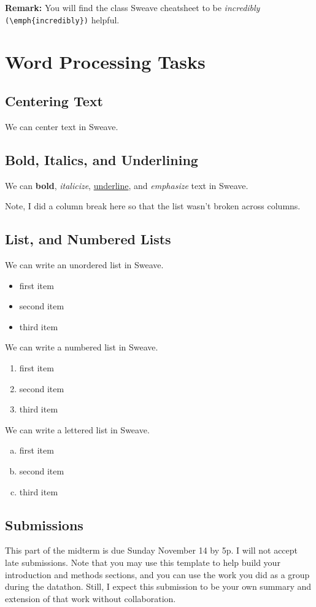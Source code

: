 \documentclass{article}\usepackage[]{graphicx}\usepackage[]{xcolor}
\begin{document}
\begin{multicols}{2}
\noindent \textbf{Remark:} You will find the class Sweave cheatsheet to be \textit{incredibly} \verb|(\emph{incredibly})| helpful. 

\section{Word Processing Tasks}

\subsection{Centering Text}
\begin{center}
We can center text in Sweave.
\end{center}

\subsection{Bold, Italics, and Underlining}
\noindent We can \textbf{bold}, \textit{italicize}, \underline{underline}, and \emph{emphasize} text in Sweave.

Note, I did a column break here so that the list wasn't broken across columns.
\columnbreak

\subsection{List, and Numbered Lists}
We can write an unordered list in Sweave. 
\begin{itemize}\itemsep0em
\item first item
\item second item
\item third item
\end{itemize}
We can write a numbered list in Sweave.
\begin{enumerate}[1.]\itemsep0em
\item first item
\item second item
\item third item
\end{enumerate}
We can write a lettered list in Sweave.
\begin{enumerate}[a.]\itemsep0em
\item first item
\item second item
\item third item
\end{enumerate}

\subsection{Submissions}
This part of the midterm is due Sunday November 14 by 5p. I will not accept late submissions. Note that you may use this template to help build your introduction and methods sections, and you can use the work you did as a group during the datathon. Still, I expect this submission to be your own summary and extension of that work without collaboration. 


\end{multicols}
\end{document}
